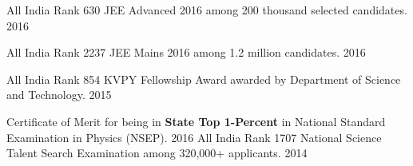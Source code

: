 \begin{cvhonors}
	\cvhonor
		{All India Rank 630}
		{JEE Advanced 2016 among 200 thousand selected candidates.}
		{}
		{2016}

	\cvhonor
		{All India Rank 2237}
		{JEE Mains 2016 among 1.2 million candidates.}
		{}
		{2016}

	\cvhonor
		{All India Rank 854}
		{KVPY Fellowship Award awarded by Department of Science and Technology.}
		{}
		{2015}

	\cvhonor
		{Certificate of Merit}{
			for being in \textbf{State Top 1-Percent} in National Standard Examination in Physics (NSEP).
		}
		{}
		{2016}
	\cvhonor
		{All India Rank 1707}
		{National Science Talent Search Examination among 320,000+ applicants.}
		{}
		{2014}

\end{cvhonors}

